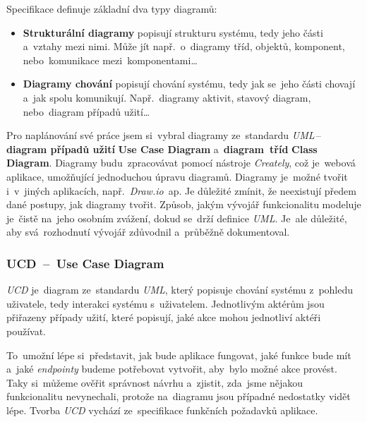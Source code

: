 \documentclass[10pt,a4paper]{article}
\begin{document}
        Specifikace definuje základní dva typy diagramů:
        \begin{itemize}
            \item \textbf{Strukturální diagramy} popisují strukturu systému, tedy jeho části a~vztahy mezi nimi. Může jít např.~o~diagramy tříd, objektů, komponent, nebo~komunikace mezi~komponentami\dots
            \item \textbf{Diagramy chování} popisují chování systému, tedy jak se~jeho části chovají a~jak spolu komunikují. Např.~diagramy aktivit, stavový diagram, nebo~diagram případů užití\dots
        \end{itemize}

        Pro naplánování své práce jsem si~vybral diagramy ze~standardu \emph{UML}\,--\,\textbf{diagram případů užití} \textbf{Use Case Diagram} a~\textbf{diagram~tříd} \textbf{Class Diagram}. Diagramy budu~zpracovávat pomocí nástroje \emph{Creately}, což je~webová aplikace, umožňující jednoduchou úpravu diagramů. Diagramy je~možné tvořit i~v~jiných aplikacích, např.~\emph{Draw.io}~ap. Je důležité zmínit, že neexistují předem dané postupy, jak diagramy tvořit. Způsob, jakým vývojář funkcionalitu modeluje je~čistě na~jeho osobním zvážení, dokud se~drží definice \emph{UML}. Je~ale důležité, aby svá~rozhodnutí vývojář zdůvodnil a~průběžně dokumentoval. \cite{uml:diagram}

        \subsubsection{UCD~--~Use Case Diagram}
        \emph{UCD} je~diagram ze~standardu \emph{UML}, který popisuje chování systému z~pohledu uživatele, tedy interakci systému s~uživatelem. Jednotlivým aktérům jsou přiřazeny případy užití, které popisují, jaké akce mohou jednotliví aktéři používat.

        To~umožní lépe si~představit, jak bude aplikace fungovat, jaké funkce bude mít a~jaké \emph{endpointy} budeme potřebovat vytvořit, aby~bylo možné akce provést. Taky si~můžeme ověřit správnost návrhu a~zjistit, zda~jsme nějakou funkcionalitu nevynechali, protože na~diagramu jsou případné nedostatky vidět lépe. Tvorba \emph{UCD} vychází ze~specifikace funkčních požadavků aplikace. \cite{uml:usecase}
\end{document}
